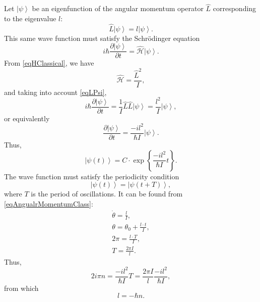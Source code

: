 Let $\left|\psi\right>$ be an eigenfunction of the angular momentum operator $\hat{L}$
corresponding to the eigenvalue $l$:
\begin{equation}
\hat{L} \left|\psi\right> = l \left|\psi\right>.
\label{eqLPsi}
\end{equation}
This same wave function must satisfy the Schrödinger equation
\[
i \hbar \frac{\partial \left|\psi\right>}{ \partial t} = 
\hat { \mathcal{H} } \left|\psi\right>.
\]
From \eqref{eqHClassical}, we have
\[
\hat { \mathcal{H} } = \frac{\hat{L}^2}{I},
\]
and taking into account \eqref{eqLPsi},
\[
i \hbar \frac{\partial \left|\psi\right>}{ \partial t} = 
\frac{1}{I} \hat{L} \hat{L} \left|\psi\right> = 
\frac{l^2}{I} \left|\psi\right>,
\]
or equivalently
\[
\frac{\partial \left|\psi\right>}{ \partial t} = 
\frac{-i l^2}{\hbar I} \left|\psi\right>.
\]
Thus,
\[
\left|\psi\left(t \right)\right> = C \cdot \exp\left\{\frac{-i l^2}{\hbar
    I} t
\right\}.
\]
The wave function must satisfy the periodicity condition
\[
\left|\psi\left(t \right) \right>= \left|\psi\left(t + T \right)\right>,
\]
where $T$ is the period of oscillations. It can be found from
\eqref{eqAngualrMomentumClass}:
\begin{eqnarray}
\dot{\theta} = \frac{l}{I},
\nonumber \\
\theta = \theta_0 + \frac{l \cdot t}{I},
\nonumber \\
2 \pi = \frac{l \cdot T}{I},
\nonumber \\
T = \frac{2 \pi I}{l}.
\nonumber 
\end{eqnarray}
Thus,
\[
2 i \pi n = \frac{-i l^2}{\hbar I} T = 
\frac{2 \pi I}{l} \frac{-i l^2}{\hbar I},
\]
from which
\[
l = -\hbar n.
\]
